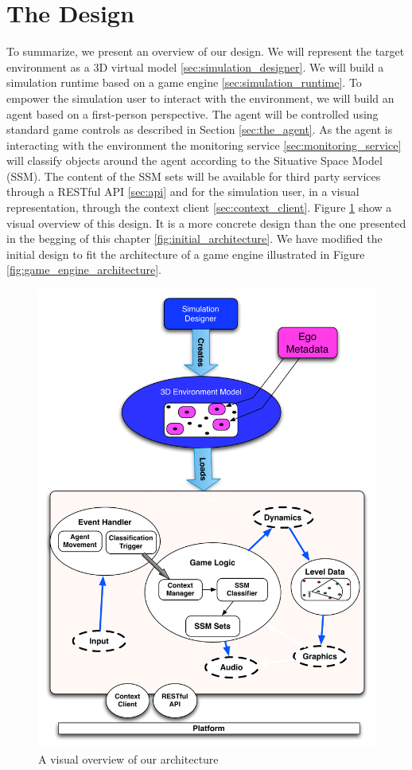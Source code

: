 \section{The Design} %
\label{sec:the_design}
To summarize, we present an overview of our design. We will represent the target environment as a 3D virtual model \ref{sec:simulation_designer}. We will build a simulation runtime based on a game engine \ref{sec:simulation_runtime}. To empower the simulation user to interact with the environment, we will build an agent based on a first-person perspective. The agent will be controlled using standard game controls as described in Section \ref{sec:the_agent}. As the agent is interacting with the environment the monitoring service \ref{sec:monitoring_service} will classify objects around the agent according to the Situative Space Model (SSM). The content of the SSM sets will be available for third party services through a RESTful API \ref{sec:api} and for the simulation user, in a visual representation, through the context client \ref{sec:context_client}. Figure \ref{fig:final_architecture} show a visual overview of this design. It is a more concrete design than the one presented in the begging of this chapter \ref{fig:initial_architecture}. We have modified the initial design to fit the architecture of a game engine illustrated in Figure \ref{fig:game_engine_architecture}.
\begin{figure}[H]
	\centering
	\includegraphics[width=\linewidth]{gfx/Chapter3/final_architecture}
	\caption{A visual overview of our architecture}
	\label{fig:final_architecture}
\end{figure}
